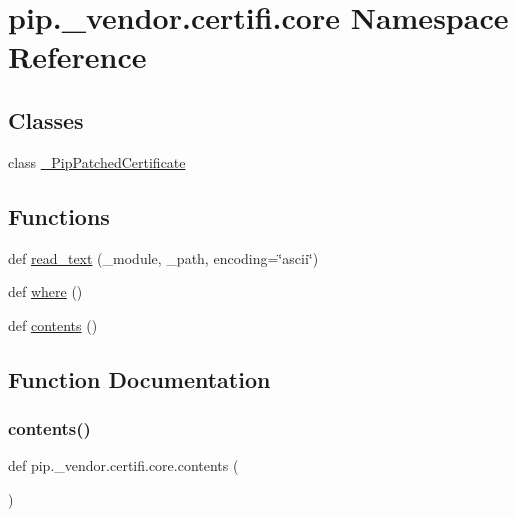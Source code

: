 \hypertarget{namespacepip_1_1__vendor_1_1certifi_1_1core}{}\section{pip.\+\_\+vendor.\+certifi.\+core Namespace Reference}
\label{namespacepip_1_1__vendor_1_1certifi_1_1core}
\subsection*{Classes}
\begin{DoxyCompactItemize}
\item 
class \hyperlink{classpip_1_1__vendor_1_1certifi_1_1core_1_1__PipPatchedCertificate}{\+\_\+\+Pip\+Patched\+Certificate}
\end{DoxyCompactItemize}
\subsection*{Functions}
\begin{DoxyCompactItemize}
\item 
def \hyperlink{namespacepip_1_1__vendor_1_1certifi_1_1core_a5097f182c2fa5d8d4da2f7497bc5807d}{read\+\_\+text} (\+\_\+module, \+\_\+path, encoding=\char`\"{}ascii\char`\"{})
\item 
def \hyperlink{namespacepip_1_1__vendor_1_1certifi_1_1core_a7692372d29c6b0c854133d9b5a05b4ee}{where} ()
\item 
def \hyperlink{namespacepip_1_1__vendor_1_1certifi_1_1core_a3dfec4dec4b25a5361392472f9ad92a3}{contents} ()
\end{DoxyCompactItemize}


\subsection{Function Documentation}
\mbox{\label{namespacepip_1_1__vendor_1_1certifi_1_1core_a3dfec4dec4b25a5361392472f9ad92a3}} 
\subsubsection{\texorpdfstring{contents()}{contents()}}
{\footnotesize\ttfamily def pip.\+\_\+vendor.\+certifi.\+core.\+contents (\begin{DoxyParamCaption}{ }\end{DoxyParamCaption})}

